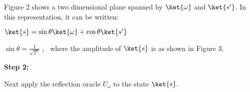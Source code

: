 \documentclass{article}
\begin{document}
\begin{tikzpicture}[x=0.75pt,y=0.75pt,yscale=-1,xscale=1]
\end{tikzpicture}

Figure 2 shows a two dimensional plane spanned by $\ket{\omega}$ and $\ket{s'}$. In this representation, it can be written:
\vspace{5mm}

\qquad $\ket{s} = \sin\theta\ket{\omega} + \cos\theta\ket{s'}$
\vspace{5mm}

\qquad $\sin\theta = \frac{1}{\sqrt{2^n}}$ , \ where the amplitude of $\ket{s}$ is as shown in Figure 3.
\vspace{5mm}

\textbf{Step 2:}
\vspace{5mm}

Next apply the reflection oracle $U_\omega$ to the state $\ket{s}$.
\vspace{5mm}

\end{document}
